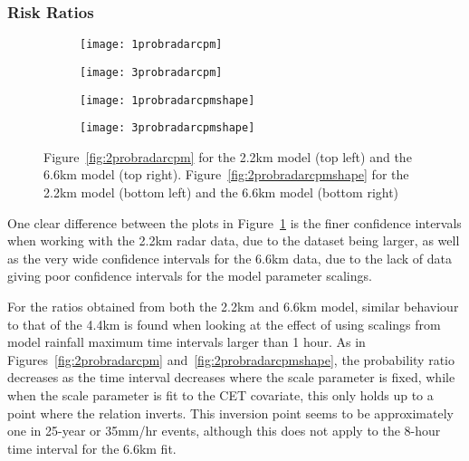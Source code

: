 \subsubsection{Risk Ratios}

\begin{figure}[H]
    \centering
    \begin{subfigure}{0.48\textwidth}
        \centering
        \texttt{[image: 1probradarcpm]}
    \end{subfigure}
    \hfill
    \begin{subfigure}{0.48\textwidth}
        \centering
        \texttt{[image: 3probradarcpm]}
    \end{subfigure}
    \begin{subfigure}{0.48\textwidth}
        \centering
        \texttt{[image: 1probradarcpmshape]}
    \end{subfigure}
    \hfill
    \begin{subfigure}{0.48\textwidth}
        \centering
        \texttt{[image: 3probradarcpmshape]}
    \end{subfigure}
    \caption[Figures~\ref{fig:2probradarcpm} and~\ref{fig:2probradarcpmshape} for the 2.2km and 6.6km models.]{
        Figure~\ref{fig:2probradarcpm} for the 2.2km model (top left) and the 6.6km model (top right).
    Figure~\ref{fig:2probradarcpmshape} for the 2.2km model (bottom left) and the 6.6km model (bottom right)}
    \label{fig:13probradarcpm}
\end{figure}

One clear difference between the plots in Figure~\ref{fig:13probradarcpm} is the finer confidence intervals
    when working with the 2.2km radar data, due to the dataset being larger,
    as well as the very wide confidence intervals for the 6.6km data,
    due to the lack of data giving poor confidence intervals for the model parameter scalings.

For the ratios obtained from both the 2.2km and 6.6km model,
    similar behaviour to that of the 4.4km is found when looking at the effect of using scalings from model rainfall maximum time intervals larger than 1 hour.
As in Figures~\ref{fig:2probradarcpm} and~\ref{fig:2probradarcpmshape},
    the probability ratio decreases as the time interval decreases where the scale parameter is fixed,
    while when the scale parameter is fit to the CET covariate,
    this only holds up to a point where the relation inverts.
This inversion point seems to be approximately one in 25-year or 35mm/hr events,
    although this does not apply to the 8-hour time interval for the 6.6km fit.

